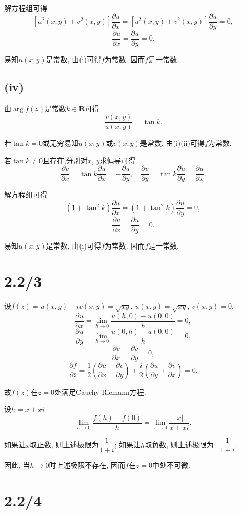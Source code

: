 \documentclass{article}
\begin{document}
解方程组可得
$$\left[u^2(x,y)+v^2(x,y)\right]\frac{\partial u}{\partial x}=\left[u^2(x,y)+v^2(x,y)\right]\frac{\partial u}{\partial y}=0,$$
$$\frac{\partial u}{\partial x}=\frac{\partial u}{\partial y}=0.$$

易知$u(x,y)$是常数, 由(i)可得$f$为常数. 因而$f$是一常数.

\subsection*{(iv)}

由$\arg f(z)$是常数$k\in\mathbf{R}$可得
$$\frac{v(x,y)}{u(x,y)}=\tan k.$$

若$\tan k=0$或无穷易知$u(x,y)$或$v(x,y)$是常数, 由(i)(ii)可得$f$为常数.

若$\tan k\neq0$且存在,分别对$x$, $y$求偏导可得
$$\frac{\partial v}{\partial x}=\tan k\frac{\partial u}{\partial x}=-\frac{\partial u}{\partial y},\quad\frac{\partial v}{\partial y}=\tan k\frac{\partial u}{\partial y}=\frac{\partial u}{\partial x}.$$

解方程组可得
$$(1+\tan^2k)\frac{\partial u}{\partial x}=(1+\tan^2k)\frac{\partial u}{\partial y}=0,$$
$$\frac{\partial u}{\partial x}=\frac{\partial u}{\partial y}=0.$$

易知$u(x,y)$是常数, 由(i)可得$f$为常数. 因而$f$是一常数.

\section{2.2/3}

设$f(z)=u(x,y)+iv(x,y)=\sqrt{xy}$, $u(x,y)=\sqrt{xy}$, $v(x,y)=0$.
$$\frac{\partial u}{\partial x}=\lim_{h\to0}\frac{u(h,0)-u(0,0)}{h}=0,$$
$$\frac{\partial u}{\partial y}=\lim_{h\to0}\frac{u(0,h)-u(0,0)}{h}=0,$$
$$\frac{\partial v}{\partial x}=\frac{\partial v}{\partial y}=0,$$
$$\frac{\partial f}{\partial\bar{z}}=\frac{1}{2}\left(\frac{\partial u}{\partial x}-\frac{\partial v}{\partial y}\right)+\frac{i}{2}\left(\frac{\partial u}{\partial y}+\frac{\partial v}{\partial x}\right)=0.$$

故$f(z)$在$z=0$处满足Cauchy-Riemann方程.

设$h=x+xi$
$$\lim_{h\to0}\frac{f(h)-f(0)}{h}=\lim_{x\to0}\frac{|x|}{x+xi}.$$

如果让$x$取正数, 则上述极限为$\dfrac{1}{1+i}$; 如果让$h$取负数, 则上述极限为$-\dfrac{1}{1+i}$.

因此, 当$h\to0$时上述极限不存在, 因而$f$在$z=0$中处不可微.

\section{2.2/4}
\end{document}

